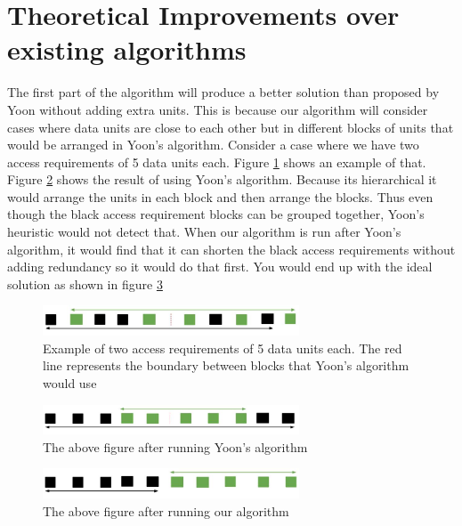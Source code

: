 \documentclass[conference]{acmsiggraph}
\begin{document}
\section{Theoretical Improvements over existing algorithms}

The first part of the algorithm will produce a better solution than proposed by Yoon without adding extra units. This is because our algorithm will consider cases where data units are close to each other but in different blocks of units that would be arranged in Yoon's algorithm. Consider a case where we have two access requirements of 5 data units each. Figure \ref{YoonImprovement1} shows an example of that. Figure \ref{YoonImprovement2} shows the result of using Yoon's algorithm. Because its hierarchical it would arrange the units in each block and then arrange the blocks. Thus even though the black access requirement blocks can be grouped together, Yoon's heuristic would not detect that. When our algorithm is run after Yoon's algorithm, it would find that it can shorten the black access requirements without adding redundancy so it would do that first. You would end up with the ideal solution as shown in figure \ref{YoonImprovement3}

\begin{figure}[ht]
\centering
\includegraphics[width=3in]{ImprovementOverYoon_before.jpg}
\caption{Example of two access requirements of 5 data units each. The red line represents the boundary between blocks that Yoon's algorithm would use}
\label{YoonImprovement1}
\end{figure}

\begin{figure}[ht]
\centering
\includegraphics[width=3in]{ImprovementOverYoon_afterYoons.jpg}
\caption{The above figure after running Yoon's algorithm}
\label{YoonImprovement2}
\end{figure}

\begin{figure}[ht]
\centering
\includegraphics[width=3in]{ImprovementOverYoon_afterOurs.jpg}
\caption{The above figure after running our algorithm}
\label{YoonImprovement3}
\end{figure}
\end{document}
